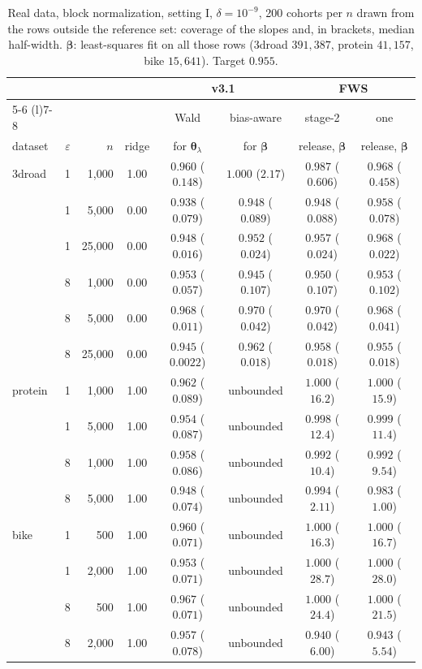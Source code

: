 \documentclass[11pt]{article}
\theoremstyle{definition}
\theoremstyle{plain}
\newcommand{\bbeta}{\boldsymbol{\beta}}
\newcommand{\btheta}{\boldsymbol{\theta}}
\begin{document}
\begin{table}[t]
  \centering
  \small
  \caption{Real data, block normalization, setting I, $\delta = 10^{-9}$, 200 cohorts per $n$ drawn from the rows outside the reference set: coverage of the slopes and, in brackets, median half-width. $\bbeta$: least-squares fit on all those rows (3droad $391{,}387$, protein $41{,}157$, bike $15{,}641$). Target $0.955$.}
  \label{tab:fws_real}
  \footnotesize
  \setlength{\tabcolsep}{3pt}
  \begin{tabular}{@{}lrrccccc@{}}
    \toprule
    & & & & \multicolumn{2}{c}{v3.1} & \multicolumn{2}{c}{FWS} \\
    \cmidrule(lr){5-6} \cmidrule(l){7-8}
    & & & & Wald & bias-aware & stage-2 & one \\
    dataset & $\varepsilon$ & $n$ & ridge & for $\btheta_\lambda$ & for $\bbeta$ & release, $\bbeta$ & release, $\bbeta$ \\
    \midrule
    3droad & 1 & 1{,}000 & 1.00 & $0.960$ ($0.148$) & $1.000$ ($2.17$) & $0.987$ ($0.606$) & $0.968$ ($0.458$) \\
     & 1 & 5{,}000 & 0.00 & $0.938$ ($0.079$) & $0.948$ ($0.089$) & $0.948$ ($0.088$) & $0.958$ ($0.078$) \\
     & 1 & 25{,}000 & 0.00 & $0.948$ ($0.016$) & $0.952$ ($0.024$) & $0.957$ ($0.024$) & $0.968$ ($0.022$) \\
     & 8 & 1{,}000 & 0.00 & $0.953$ ($0.057$) & $0.945$ ($0.107$) & $0.950$ ($0.107$) & $0.953$ ($0.102$) \\
     & 8 & 5{,}000 & 0.00 & $0.968$ ($0.011$) & $0.970$ ($0.042$) & $0.970$ ($0.042$) & $0.968$ ($0.041$) \\
     & 8 & 25{,}000 & 0.00 & $0.945$ ($0.0022$) & $0.962$ ($0.018$) & $0.958$ ($0.018$) & $0.955$ ($0.018$) \\
    \addlinespace
    protein & 1 & 1{,}000 & 1.00 & $0.962$ ($0.089$) & unbounded & $1.000$ ($16.2$) & $1.000$ ($15.9$) \\
     & 1 & 5{,}000 & 1.00 & $0.954$ ($0.087$) & unbounded & $0.998$ ($12.4$) & $0.999$ ($11.4$) \\
     & 8 & 1{,}000 & 1.00 & $0.958$ ($0.086$) & unbounded & $0.992$ ($10.4$) & $0.992$ ($9.54$) \\
     & 8 & 5{,}000 & 1.00 & $0.948$ ($0.074$) & unbounded & $0.994$ ($2.11$) & $0.983$ ($1.00$) \\
    \addlinespace
    bike & 1 & 500 & 1.00 & $0.960$ ($0.071$) & unbounded & $1.000$ ($16.3$) & $1.000$ ($16.7$) \\
     & 1 & 2{,}000 & 1.00 & $0.953$ ($0.071$) & unbounded & $1.000$ ($28.7$) & $1.000$ ($28.0$) \\
     & 8 & 500 & 1.00 & $0.967$ ($0.071$) & unbounded & $1.000$ ($24.4$) & $1.000$ ($21.5$) \\
     & 8 & 2{,}000 & 1.00 & $0.957$ ($0.078$) & unbounded & $0.940$ ($6.00$) & $0.943$ ($5.54$) \\
    \bottomrule
  \end{tabular}
\end{table}
\end{document}
